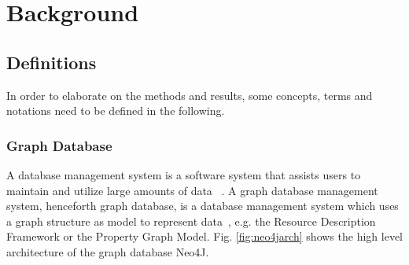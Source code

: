 \chapter{Background} 
\section{Definitions}
In order to elaborate on the methods and results, some concepts, terms and notations need to be defined in the following.
\subsection{Graph Database}
A database management system is a  software system that assists users to  maintain and utilize large amounts of data ~\cite{Ramakrishnan:2002:DMS:560733}.
A graph database management system, henceforth graph database, is a database management system which uses a graph structure as model to represent data~\cite{neo4j_book}, e.g. the Resource Description Framework or the Property Graph Model. Fig. \ref{fig:neo4jarch} shows the high level architecture of the graph database Neo4J. \\


